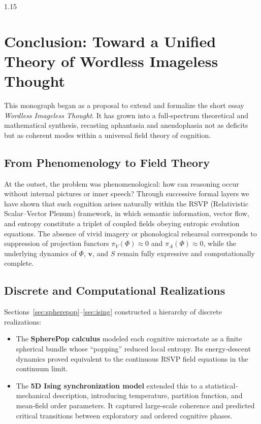 \documentclass[12pt,a4paper]{article}
\begin{document}
\begin{spacing}{1.15}
\section{Conclusion: Toward a Unified Theory of Wordless Imageless Thought}
\label{sec:conclusion}

This monograph began as a proposal to extend and formalize the short essay
\emph{Wordless Imageless Thought}.
It has grown into a full‐spectrum theoretical and mathematical synthesis,
recasting aphantasia and anendophasia not as deficits but as coherent
modes within a universal field theory of cognition.

\subsection{From Phenomenology to Field Theory}

At the outset, the problem was phenomenological:
how can reasoning occur without internal pictures or inner speech?
Through successive formal layers we have shown that such cognition
arises naturally within the \textsc{RSVP} (Relativistic Scalar–Vector Plenum)
framework, in which semantic information, vector flow, and entropy
constitute a triplet of coupled fields obeying entropic evolution equations.
The absence of vivid imagery or phonological rehearsal corresponds to
suppression of projection functors
$\pi_{V}(\Phi)\!\approx\!0$ and $\pi_{A}(\Phi)\!\approx\!0$,
while the underlying dynamics of $\Phi$, $\mathbf{v}$, and $S$
remain fully expressive and computationally complete.

\subsection{Discrete and Computational Realizations}

Sections~\ref{sec:spherepop}–\ref{sec:ising} constructed a hierarchy of
discrete realizations:

\begin{itemize}[leftmargin=1.2em]
  \item The \textbf{SpherePop calculus} modeled each cognitive microstate
        as a finite spherical bundle whose ``popping'' reduced local
        entropy.  Its energy‐descent dynamics proved equivalent to the
        continuous RSVP field equations in the continuum limit.
  \item The \textbf{5D Ising synchronization model} extended this to
        a statistical‐mechanical description, introducing temperature,
        partition function, and mean‐field order parameters.
        It captured large‐scale coherence and predicted critical
        transitions between exploratory and ordered cognitive phases.
\end{itemize}


\end{spacing}
\end{document}
